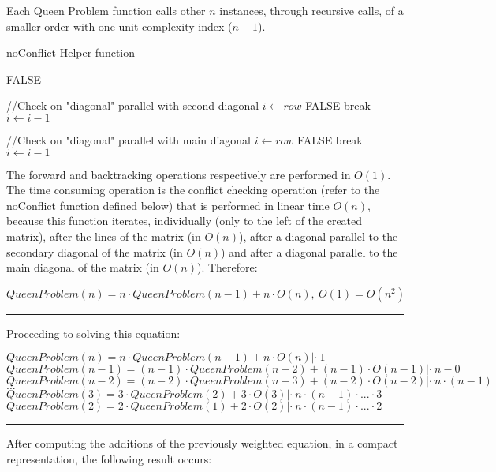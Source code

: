 Each Queen Problem function calls other $ n $ instances, through recursive calls, of a smaller order with one unit complexity index ($ n-1 $).


\begin{algorithm}[H]
\caption{noConflict Helper function}
\begin{algorithmic}[1]
			\State \Return FALSE
		\EndIf
	\EndFor
	
	
	//Check on "diagonal" parallel with second diagonal
	\State $i \gets row$
			\State \Return FALSE
		\EndIf
		\State break
	\EndIf
	\State $i \gets i-1$	
	\EndFor
	
	//Check on "diagonal" parallel with main diagonal
	\State $i \gets row$
			\State \Return FALSE
		\EndIf
		\State break
	\EndIf
	\State $i \gets i-1$	
	\EndFor

\EndProcedure

\end{algorithmic}
\end{algorithm}

The forward and backtracking operations respectively are performed in $ O (1) $. The time consuming operation is the conflict checking operation (refer to the noConflict function defined below) that is performed in linear time $ O (n) $, because this function iterates, individually (only to the left of the created matrix), after the lines of the matrix (in $ O (n) $), after a diagonal parallel to the secondary diagonal of the matrix (in $ O (n) $) and after a diagonal parallel to the main diagonal of the matrix (in $ O (n) $).
Therefore:

$QueenProblem(n) = n \cdot QueenProblem(n-1) + n \cdot O(n),\ O(1)=O(n^2)$ \\ 
\noindent\rule{16cm}{0.4pt}
Proceeding to solving this equation:


$QueenProblem(n) = n \cdot QueenProblem(n-1) + n \cdot O(n) |\cdot\ 1$ \\
$QueenProblem(n-1) = (n-1) \cdot QueenProblem(n-2) + (n-1) \cdot O(n-1) |\cdot\ n-0$ \\
$QueenProblem(n-2) = (n-2) \cdot QueenProblem(n-3) + (n-2) \cdot O(n-2) |\cdot\ n\cdot (n-1)$ \\
$...$ \\
$QueenProblem(3) = 3 \cdot QueenProblem(2) + 3 \cdot O(3) |\cdot\ n\cdot (n-1) \cdot ... \cdot 3$ \\
$QueenProblem(2) = 2 \cdot QueenProblem(1) + 2 \cdot O(2) |\cdot\ n\cdot (n-1) \cdot ... \cdot 2$ \\
\noindent\rule{16cm}{0.4pt}
After computing the additions of the previously weighted equation, in a compact representation, the following result occurs:

